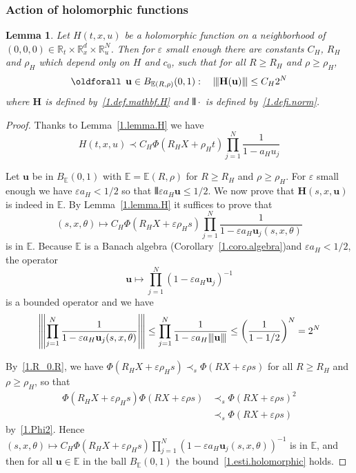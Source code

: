 \documentclass[10pt]{amsart}
\newtheorem{lemm}[cdrthm]{Lemma}
\theoremstyle{definition}
\theoremstyle{plain}
\newcommand*\e{\varepsilon}
\newcommand*\R{{\mathbb R}}
\newcommand*\EE{{\mathbb E}}
\newcommand{\ubf}{{\mathbf u}}
\newcommand{\Hbf}{{\mathbf H}}
\newcommand*\dsp{\displaystyle}
\DeclarePairedDelimiter{\VERT}{|\mkern -1.6mu|\mkern -1.6mu|}{|\mkern -1.6mu|\mkern -1.6mu|}
\renewcommand*{\forall}{\mathrel{\oldforall}}
\begin{document}
\subsubsection{Action of holomorphic functions}


\begin{lemm}\label{1.lemma.holomorphic}
Let $H(t,x,u)$ be a holomorphic function on a neighborhood of $(0,0,0)\in\R_{t}\times\R_{x}^{d}\times\R_{u}^{N}$. Then for $\e$ small enough there are constants $C_H$, $R_H$ and $\rho_H$ which depend only on $H$ and $c_0$, such that for all $R\geq R_H$ and $\rho\geq\rho_H$,
\begin{equation}\label{1.esti.holomorphic}
\forall \,\ubf\in B_{\EE(R,\rho)}(0,1): \quad \VERT{\Hbf(\ubf)}\leq C_{H}2^{N}
\end{equation}
where $\Hbf$ is defined by~\eqref{1.def.mathbf.H} and $\VERT{\cdot}$ is defined by~\eqref{1.defi.norm}.
\end{lemm}

\begin{proof}
Thanks to Lemma~\ref{1.lemma.H} we have
\[
H(t,x,u) \prec C_H \Phi(R_H X + \rho_H t) \prod_{j=1}^{N}\frac{\dsp 1}{1 - a_H u_j}
\]


Let $\ubf$ be in $ B_{\EE}(0,1)$ with $\EE=\EE(R,\rho)$ for $R \geq R_H$ and $\rho \geq \rho_H$. For $\e$ small enough we have $ \e a_{H} < 1/2 $ so that $ \VERT {\e a_H \ubf} \leq 1/2 $. We now prove that $\Hbf(s,x,\ubf)$ is indeed in $\EE$. By Lemma~\ref{1.lemma.H} it suffices to prove that
\[
(s,x,\theta) \mapsto C_H \Phi(R_H X + \e\rho_H s) \prod_{j=1}^{N}\frac{\dsp 1}{1 - \e a_H \ubf_j(s,x,\theta)}
\]
is in $\EE$. Because $\EE$ is a Banach algebra (Corollary~\ref{1.coro.algebra})and $\e a_{H} < 1/2$, the operator
\[
\ubf \mapsto \prod_{j=1}^{N}\left(1 - \e a_H \ubf_j\right)^{-1}
\]
is a bounded operator and we have
\[
\left|\mkern -1.6mu\left|\mkern -1.6mu\left|\prod_{j=1}^{N}\frac{\dsp 1}{1 - \e a_H \ubf_j(s,x,\theta)}\right|\mkern -1.6mu\right|\mkern -1.6mu\right|
\leq
\prod_{j=1}^{N}\frac{\dsp 1}{1 - \e a_H \VERT{\ubf}} \leq \left(\frac{\dsp 1}{1 - 1/2}\right)^{N} = 2^{N}
\]


By~\eqref{1.R_0.R}, we have $\Phi(R_H X + \e\rho_H s) \prec_{s} \Phi(R X+\e\rho s)$ for all $R\geq R_H$ and $\rho\geq\rho_H$, so that
\begin{align*}
\Phi(R_H X + \e\rho_H s) \Phi(R X+\e\rho s) & \prec_{s} \Phi(R X+\e\rho s)^2 \\
& \prec_{s} \Phi(R X+\e\rho s)
\end{align*}
by~\eqref{1.Phi2}. Hence $(s,x,\theta) \mapsto C_H \Phi(R_H X + \e\rho_H s) \prod_{j=1}^{N}(1 - \e a_H \ubf_j(s,x,\theta))^{-1}$ is in $\EE$, and then for all $\ubf\in\EE$ in the ball $B_{\EE}(0,1)$ the bound~\eqref{1.esti.holomorphic} holds.
\end{proof}
\end{document}
